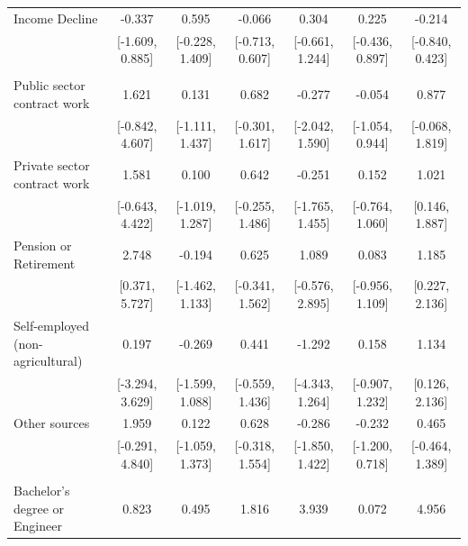 \documentclass[
  10,
  letterpaper,
  DIV=11,
  numbers=noendperiod]{scrartcl}
\begin{document}
\begin{table}
\begin{tabular}[t]{lcccccc}
\hspace{1em}Income Decline & -0.337 & 0.595 & -0.066 & 0.304 & 0.225 & -0.214\\
\hspace{1em} & {}[-1.609, 0.885] & {}[-0.228, 1.409] & {}[-0.713, 0.607] & {}[-0.661, 1.244] & {}[-0.436, 0.897] & {}[-0.840, 0.423]\\
\addlinespace[0.3em]
\multicolumn{7}{l}{\cellcolor[HTML]{3498DB}{\textbf{Income Source}}}\\
\hspace{1em}Public sector contract work & 1.621 & 0.131 & 0.682 & -0.277 & -0.054 & 0.877\\
\hspace{1em} & {}[-0.842, 4.607] & {}[-1.111, 1.437] & {}[-0.301, 1.617] & {}[-2.042, 1.590] & {}[-1.054, 0.944] & {}[-0.068, 1.819]\\
\hspace{1em}Private sector contract work & 1.581 & 0.100 & 0.642 & -0.251 & 0.152 & 1.021\\
\hspace{1em} & {}[-0.643, 4.422] & {}[-1.019, 1.287] & {}[-0.255, 1.486] & {}[-1.765, 1.455] & {}[-0.764, 1.060] & {}[0.146, 1.887]\\
\hspace{1em}Pension or Retirement & 2.748 & -0.194 & 0.625 & 1.089 & 0.083 & 1.185\\
\hspace{1em} & {}[0.371, 5.727] & {}[-1.462, 1.133] & {}[-0.341, 1.562] & {}[-0.576, 2.895] & {}[-0.956, 1.109] & {}[0.227, 2.136]\\
\hspace{1em}Self-employed (non-agricultural) & 0.197 & -0.269 & 0.441 & -1.292 & 0.158 & 1.134\\
\hspace{1em} & {}[-3.294, 3.629] & {}[-1.599, 1.088] & {}[-0.559, 1.436] & {}[-4.343, 1.264] & {}[-0.907, 1.232] & {}[0.126, 2.136]\\
\hspace{1em}Other sources & 1.959 & 0.122 & 0.628 & -0.286 & -0.232 & 0.465\\
\hspace{1em} & {}[-0.291, 4.840] & {}[-1.059, 1.373] & {}[-0.318, 1.554] & {}[-1.850, 1.422] & {}[-1.200, 0.718] & {}[-0.464, 1.389]\\
\addlinespace[0.3em]
\multicolumn{7}{l}{\cellcolor[HTML]{3498DB}{\textbf{Education}}}\\
\hspace{1em}Bachelor's degree or Engineer & 0.823 & 0.495 & 1.816 & 3.939 & 0.072 & 4.956\\

\end{tabular}
\end{table}
\end{document}

